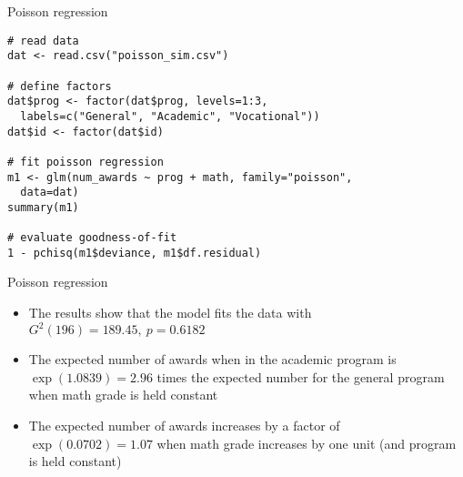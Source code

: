\documentclass{beamer}
\begin{document}
{

\begin{frame}[fragile]{Poisson regression}
  \begin{lstlisting}
# read data
dat <- read.csv("poisson_sim.csv")

# define factors
dat$prog <- factor(dat$prog, levels=1:3,
  labels=c("General", "Academic", "Vocational"))
dat$id <- factor(dat$id)

# fit poisson regression
m1 <- glm(num_awards ~ prog + math, family="poisson",
  data=dat)
summary(m1)

# evaluate goodness-of-fit
1 - pchisq(m1$deviance, m1$df.residual)
\end{lstlisting}
\end{frame}

% 
% 

}


\begin{frame}{Poisson regression}
\begin{itemize}
  \item The results show that the model fits the data with $G^2(196) =
    189.45,~p=0.6182$
  \item The expected number of awards when in the academic program is
    $\exp(1.0839) = 2.96$ times the expected number for the general program
    when math grade is held constant
  \item The expected number of awards increases by a factor of
    $\exp(0.0702) = 1.07$ when math grade increases by one unit (and
    program is held constant)
\end{itemize}
\end{frame}
\end{document}
